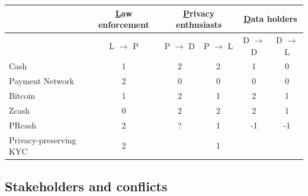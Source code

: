 \documentclass[runningheads]{llncs}
\begin{document}
\begin{table}[]
	\begin{tabular}{|l|c|c|c|c|c|}
		\hline
		&\underline{L}aw enforcement& \multicolumn{2}{c|}{\underline{P}rivacy enthusiasts} & \multicolumn{2}{c|}{\underline{D}ata holders} \\ \hline
		&    L $\rightarrow$ P   &       P $\rightarrow$ D        &      P $\rightarrow$ L        &      D $\rightarrow$ D        &     D $\rightarrow$ L          \\ \hline
		Cash 	& 1 &     2    &   2   &      1     &       0    \\ \hline
		Payment Network	& 2 &      0     &     0      &      0     &      0     \\ \hline
		Bitcoin	&  1   &  2      &    1     &     2      &   1        \\ \hline
		Zcash	& 0 &   2        &  2     &  2     &     1      \\ \hline
		PRcash~\cite{WKCC18}		& 2&    ?         &   1   &   -1        &     -1      \\ \hline
		Privacy-preserving KYC~\cite{BKT18} 	& 2 &         &    1      &           &           \\ \hline
	\end{tabular}
\end{table}
 
 \subsection{Stakeholders and conflicts}
\end{document}
